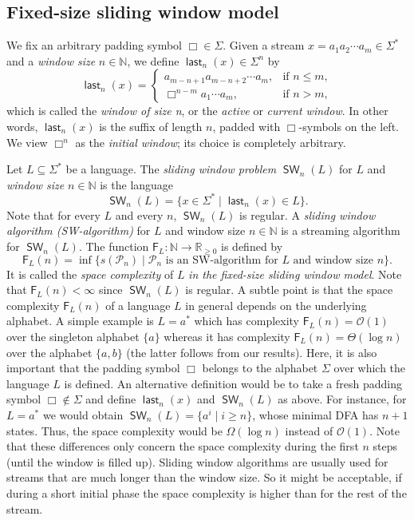 \documentclass{theoretics}
\newcommand{\N}{\mathbb{N}}
\renewcommand{\O}{\mathcal{O}}
\renewcommand{\P}{\mathcal{P}}
\newcommand{\F}{\mathsf{F}}
\DeclareMathOperator{\last}{\mathsf{last}}
\DeclareMathOperator{\SW}{\mathsf{SW}}
\renewcommand{\geq}{\geqslant}
\renewcommand{\leq}{\leqslant}
\renewcommand{\ge}{\geq}
\renewcommand{\le}{\leq}
\begin{document}
\subsection{Fixed-size sliding window model} \label{sec-fixed-size}

We fix an arbitrary padding symbol $\Box \in \Sigma$.
Given a stream $x = a_1 a_2 \cdots a_m \in \Sigma^*$ and a {\em window size} $n \in \N$,
we define $\last_n(x) \in \Sigma^n$ by
\[
	\last_n(x) =
	\begin{cases}
		a_{m-n+1} a_{m-n+2} \cdots a_m, & \text{if } n \le m, \\
		\Box^{n-m} a_1 \cdots a_m,         & \text{if } n > m,   
	\end{cases}
\]
which is called the {\em window of size n}, or the {\em active} or {\em current window}.
In other words, $\last_n(x)$ is the suffix of length $n$, padded with $\Box$-symbols on the left.
We view $\Box^n$ as the {\em initial window}; its choice is completely arbitrary.

Let $L \subseteq \Sigma^*$ be a language.
The {\em sliding window problem} $\SW_n(L)$ for $L$ and {\em window size} $n \in \N$
is the language
\[
	\SW_n(L) = \{ x \in \Sigma^* \mid \last_n(x) \in L \}.
\]
Note that for every $L$ and every $n$, $\SW_n(L)$ is regular.
A {\em sliding window algorithm (SW-algorithm)} for $L$ and window size $n \in \N$
is a streaming algorithm for $\SW_n(L)$.
The function $\F_L \colon \N \to \mathbb{R}_{\ge 0}$ is defined by
\begin{equation} \label{def-F_L(n)}
	\F_L(n) = \inf \{ s(\P_n) \mid \P_n \text{ is an SW-algorithm for } L \text{ and window size } n \}.
\end{equation}
It is called the {\em space complexity} of $L$ {\em in the fixed-size sliding window model}.
Note that $\F_L(n) < \infty$ since $\SW_n(L)$ is regular.
A subtle point is that the space complexity $\F_L(n)$ of a language $L$
in general depends on the underlying alphabet.
A simple example is $L = a^*$ which has complexity $\F_L(n) = \O(1)$
over the singleton alphabet $\{a\}$
whereas it has complexity $\F_L(n) = \Theta(\log n)$ over the alphabet $\{a,b\}$
(the latter follows from our results). Here, it is also important that the padding symbol 
$\Box$ belongs to the alphabet $\Sigma$ over which the language $L$ is defined. An alternative
definition would be to take a fresh padding symbol $\Box \notin \Sigma$ and define 
$\last_n(x)$ and $\SW_n(L)$ as above. For instance, for $L = a^*$ we would obtain
$\SW_n(L) = \{ a^i \mid i \geq n\}$, whose minimal DFA has $n+1$ states. Thus, the space complexity
would be $\Omega(\log n)$ instead of $\O(1)$. Note that these differences
only concern the space complexity during the first $n$ steps (until the window is filled up). 
Sliding window algorithms are usually used for streams that are much longer than the window size. So it might be acceptable, if 
during a short initial phase the space complexity is higher than for the rest of the stream.
\end{document}
